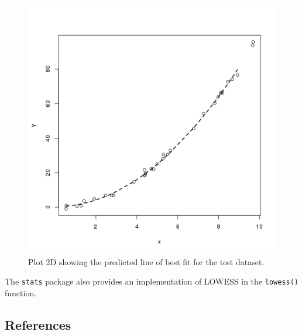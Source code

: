 

\begin{figure}[htp]
\centering
\includegraphics[scale=0.45]{book/a_regression/locally_estimated_scatterplot_smoothing_result.png}
\caption{Plot 2D showing the predicted line of best fit for the test dataset.}
\label{plot:locally_estimated_scatterplot_smoothing_result}
\end{figure}

The \texttt{stats} package also provides an implementation of LOWESS in the \texttt{lowess()} function.

\subsection{References}


